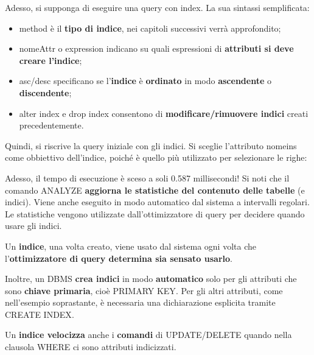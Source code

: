 \documentclass[a4paper]{article}
\begin{document}
	\noindent
	Adesso, si supponga di eseguire una query con \textcolor{Red3}{\textsf{index}}. La sua sintassi semplificata:
	
	\begin{itemize}
		\item \textsf{method} è il \textbf{tipo di indice}, nei capitoli successivi verrà approfondito;
		
		\item \textsf{nomeAttr} o \textsf{expression} indicano su quali espressioni di \textbf{attributi si deve creare l'indice};
		
		\item \textsf{asc/desc} specificano se l'\textbf{indice} è \textbf{ordinato} in modo \textbf{ascendente} o \textbf{discendente};
		
		\item \textsf{alter index} e \textsf{drop index} consentono di \textbf{modificare/rimuovere indici} creati precedentemente.
	\end{itemize}
	Quindi, si riscrive la query iniziale con gli indici. Si sceglie l'attributo \textsf{nomeins} come obbiettivo dell'indice, poiché è quello più utilizzato per selezionare le righe:
	
	Adesso, il tempo di esecuzione è sceso a soli 0.587 millisecondi! Si noti che il comando \textsf{ANALYZE} \textbf{aggiorna le statistiche del contenuto delle tabelle} (e indici). Viene anche eseguito in modo automatico dal sistema a intervalli regolari. Le statistiche vengono utilizzate dall'ottimizzatore di query per decidere quando usare gli indici.\newline
	
	\noindent
	Un \textbf{indice}, una volta creato, viene usato dal sistema ogni volta che l'\textbf{ottimizzatore di query determina sia sensato usarlo}.\newline
	
	\noindent	
	Inoltre, un DBMS \textbf{crea indici} in modo \textbf{automatico} solo per gli attributi che sono \textbf{chiave primaria}, cioè \textsf{PRIMARY KEY}. Per gli altri attributi, come nell'esempio soprastante, è necessaria una dichiarazione esplicita tramite \textsf{CREATE INDEX}.\newline
	
	\noindent
	Un \textbf{indice velocizza} anche i \textbf{comandi} di \textsf{UPDATE/DELETE} quando nella clausola \textsf{WHERE} ci sono attributi indicizzati.\newline
	
\end{document}
